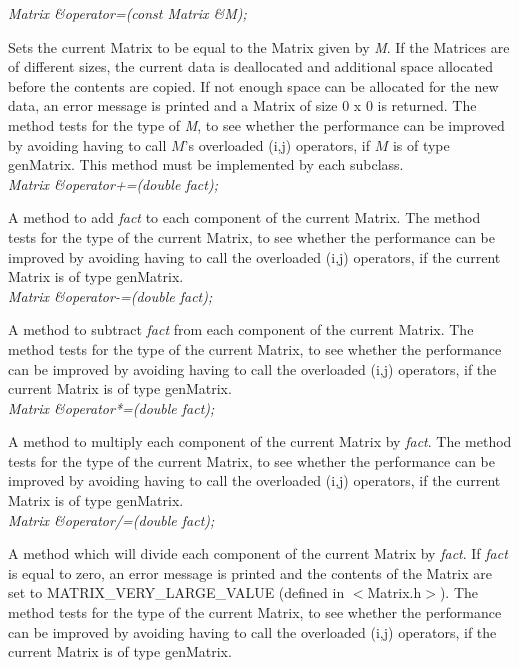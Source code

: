 {\em  Matrix \&operator=(const Matrix \&M);}

Sets the current Matrix to be equal to the Matrix given by {\em M}. If
the Matrices are of different sizes, the current data is deallocated
and additional space allocated before the contents are copied. If not
enough space can be allocated for the new data, an error message is
printed and a Matrix of size $0$ x $0$ is returned. The method tests
for the type of {\em M}, to see whether the performance can be
improved by avoiding having to call $M$'s overloaded (i,j) operators,
if $M$ is of type genMatrix. This method must be implemented by each
subclass. \\ 

{\em  Matrix \&operator+=(double fact);} 

A method to add {\em fact} to each component of the current Matrix. 
The method tests for the type of the current Matrix, to see whether
the performance can be improved by avoiding having to call the
overloaded (i,j) operators, if the current Matrix is of type
genMatrix. \\ 

{\em Matrix \&operator-=(double fact);} 

A method to subtract {\em fact} from each component of the current Matrix. 
The method tests for the type of the current Matrix, to see whether
the performance can be improved by avoiding having to call the
overloaded (i,j) operators, if the current Matrix is of type
genMatrix. \\ 

{\em Matrix \&operator*=(double fact);} 

A method to multiply each component of the current Matrix by {\em fact}. 
The method tests for the type of the current Matrix, to see whether
the performance can be improved by avoiding having to call the
overloaded (i,j) operators, if the current Matrix is of type
genMatrix. \\ 

{\em Matrix \&operator/=(double fact); } 

A method which will divide each component of the current Matrix
by {\em fact}. If {\em fact} is equal to zero, an error message is
printed and the contents of the Matrix are set to
MATRIX\_VERY\_LARGE\_VALUE (defined in $<$Matrix.h$>$). The method
tests for the type of the current Matrix, to see whether the
performance can be improved by avoiding having to call the overloaded
(i,j) operators, if the current Matrix is of type genMatrix. \\ 


